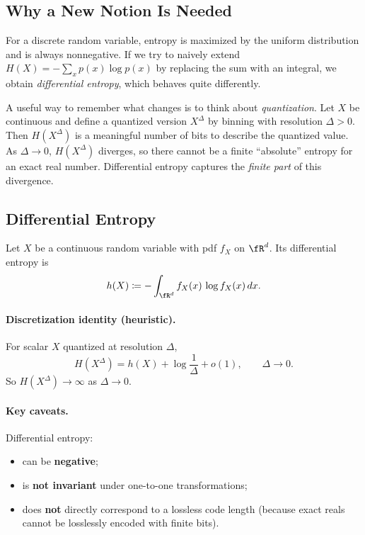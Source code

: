 
\subsection{Why a New Notion Is Needed}

For a discrete random variable, entropy is maximized by the uniform distribution and is always nonnegative.
If we try to naively extend
\(H(X)=-\sum_x p(x)\log p(x)\)
by replacing the sum with an integral, we obtain \emph{differential entropy}, which behaves quite differently.

A useful way to remember what changes is to think about \emph{quantization}.
Let $X$ be continuous and define a quantized version $X^\Delta$ by binning with resolution $\Delta>0$.
Then $H(X^\Delta)$ is a meaningful number of bits to describe the quantized value.
As $\Delta\to 0$, $H(X^\Delta)$ diverges, so there cannot be a finite ``absolute'' entropy for an exact real number.
Differential entropy captures the \emph{finite part} of this divergence.

\subsection{Differential Entropy}
\label{sec:diffent-def}

\begin{definition}
Let $X$ be a continuous random variable with pdf $f_X$ on $\fR^d$.
Its differential entropy is
\begin{equation}
    h(X) \coloneqq -\int_{\fR^d} f_X(x)\,\log f_X(x)\,dx.
\end{equation}
\end{definition}

\paragraph{Discretization identity (heuristic).}
For scalar $X$ quantized at resolution $\Delta$,
\begin{equation}
    H(X^\Delta) = h(X) + \log\frac{1}{\Delta} + o(1), \qquad \Delta\to 0.
\end{equation}
So $H(X^\Delta)\to\infty$ as $\Delta\to 0$.

\paragraph{Key caveats.}
Differential entropy:
\begin{itemize}[leftmargin=2em]
    \item can be \textbf{negative};
    \item is \textbf{not invariant} under one-to-one transformations;
    \item does \textbf{not} directly correspond to a lossless code length (because exact reals cannot be losslessly encoded with finite bits).
\end{itemize}

